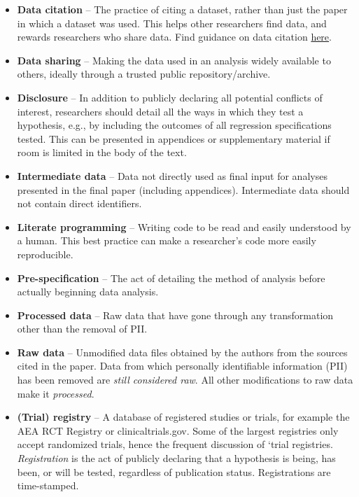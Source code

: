 \documentclass[]{book}
\begin{document}
\begin{itemize}
\item
  \textbf{Data citation} -- The practice of citing a dataset, rather than just the paper in which a dataset was used. This helps other researchers find data, and rewards researchers who share data. Find guidance on data citation \href{https://social-science-data-editors.github.io/guidance/Data_citation_guidance.html}{here}.\\
\item
  \textbf{Data sharing} -- Making the data used in an analysis widely available to others, ideally through a trusted public repository/archive.\\
\item
  \textbf{Disclosure} -- In addition to publicly declaring all potential conflicts of interest, researchers should detail all the ways in which they test a hypothesis, e.g., by including the outcomes of all regression specifications tested. This can be presented in appendices or supplementary material if room is limited in the body of the text.
\item
  \textbf{Intermediate data} -- Data not directly used as final input for analyses presented in the final paper (including appendices). Intermediate data should not contain direct identifiers.
\item
  \textbf{Literate programming} -- Writing code to be read and easily understood by a human. This best practice can make a researcher's code more easily reproducible.
\item
  \textbf{Pre-specification} -- The act of detailing the method of analysis before actually beginning data analysis.
\item
  \textbf{Processed data} -- Raw data that have gone through any transformation other than the removal of PII.\\
\item
  \textbf{Raw data} -- Unmodified data files obtained by the authors from the sources cited in the paper. Data from which personally identifiable information (PII) has been removed are \emph{still considered raw}. All other modifications to raw data make it \emph{processed}.\\
\item
  \textbf{(Trial) registry} -- A database of registered studies or trials, for example the AEA RCT Registry or clinicaltrials.gov. Some of the largest registries only accept randomized trials, hence the frequent discussion of `trial registries. \emph{Registration} is the act of publicly declaring that a hypothesis is being, has been, or will be tested, regardless of publication status. Registrations are time-stamped.

\end{itemize}
\end{document}
